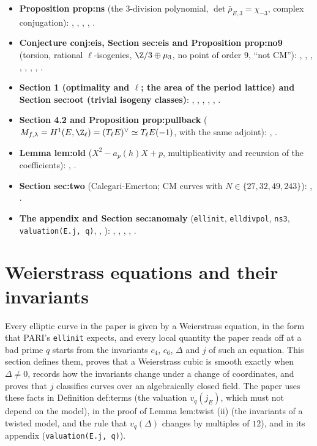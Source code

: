 \begin{itemize}
\item \textbf{Proposition prop:ns} (the $3$-division polynomial, $\det\bar\rho_{E,3}=\chi_{-3}$, complex conjugation): , , ,
, .
\item \textbf{Conjecture conj:eis, Section sec:eis and Proposition prop:no9} (torsion, rational $\ell$-isogenies, $\Z/3\oplus\mu_3$, no point of order $9$, ``not CM''): ,
, , , , , , .
\item \textbf{Section 1 (optimality and $\ell$; the area of the period lattice) and Section sec:oot (trivial isogeny classes)}: , ,
, , , .
\item \textbf{Section 4.2 and Proposition prop:pullback} ($M_{f,\lambda}=H^1(E,\Z_\ell)=(T_\ell E)^\vee\simeq T_\ell E(-1)$, with the same adjoint): ,
.
\item \textbf{Lemma lem:old} ($X^2-a_p(h)X+p$, multiplicativity and recursion of the coefficients): , .
\item \textbf{Section sec:two} (Calegari-Emerton; CM curves with $N\in\{27,32,49,243\}$): , .
\item \textbf{The appendix and Section sec:anomaly} (\texttt{ellinit}, \texttt{elldivpol}, \texttt{ns3}, \texttt{valuation(E.j, q)}, , ): ,
, , , .
\end{itemize}

\section{Weierstrass equations and their invariants}\label{sec:ellcurves:weierstrass}

Every elliptic curve in the paper is given by a Weierstrass equation, in the form that PARI's \texttt{ellinit} expects, and
every local quantity the paper reads off at a bad prime $q$ starts from the invariants $c_4$, $c_6$, $\Delta$ and $j$ of such an
equation. This section defines them, proves that a Weierstrass cubic is smooth exactly when $\Delta\ne0$, records how the
invariants change under a change of coordinates, and proves that $j$ classifies curves over an algebraically closed field.
The paper uses these facts in Definition def:terms (the valuation $v_q(j_E)$, which must not depend on the model), in the proof of
Lemma lem:twist (ii) (the invariants of a twisted model, and the rule that $v_q(\Delta)$ changes by multiples of $12$), and in its
appendix (\texttt{valuation(E.j, q)}).

